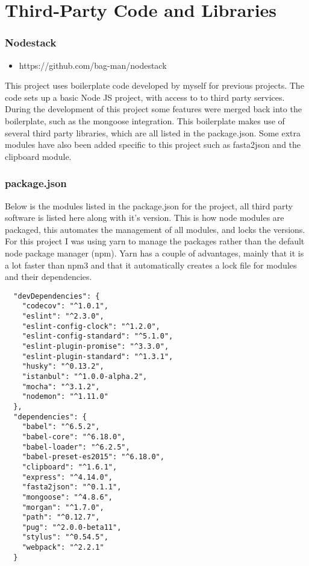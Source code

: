 \chapter{Third-Party Code and Libraries}
\subsection{Nodestack}
\begin{itemize}
  \item https://github.com/bag-man/nodestack
\end{itemize}
This project uses boilerplate code developed by myself for previous projects. The code sets up a basic Node JS project, with access to to third party services. During the development of this project some features were merged back into the boilerplate, such as the mongoose integration.  This boilerplate makes use of several third party libraries, which are all listed in the package.json. Some extra modules have also been added specific to this project such as fasta2json and the clipboard module. 


\subsection{package.json}
Below is the modules listed in the package.json for the project, all third party software is listed here along with it's version. This is how node modules are packaged, this automates the management of all modules, and locks the versions. For this project I was using yarn\cite{yarn} to manage the packages rather than the default node package manager (npm)\cite{npm}. Yarn has a couple of advantages, mainly that it is a lot faster than npm3 and that it automatically creates a lock file for modules and their dependencies. 

\begin{lstlisting}
  "devDependencies": {
    "codecov": "^1.0.1",
    "eslint": "^2.3.0",
    "eslint-config-clock": "^1.2.0",
    "eslint-config-standard": "^5.1.0",
    "eslint-plugin-promise": "^3.3.0",
    "eslint-plugin-standard": "^1.3.1",
    "husky": "^0.13.2",
    "istanbul": "^1.0.0-alpha.2",
    "mocha": "^3.1.2",
    "nodemon": "^1.11.0"
  },
  "dependencies": {
    "babel": "^6.5.2",
    "babel-core": "^6.18.0",
    "babel-loader": "^6.2.5",
    "babel-preset-es2015": "^6.18.0",
    "clipboard": "^1.6.1",
    "express": "^4.14.0",
    "fasta2json": "^0.1.1",
    "mongoose": "^4.8.6",
    "morgan": "^1.7.0",
    "path": "^0.12.7",
    "pug": "^2.0.0-beta11",
    "stylus": "^0.54.5",
    "webpack": "^2.2.1"
  }
\end{lstlisting}

